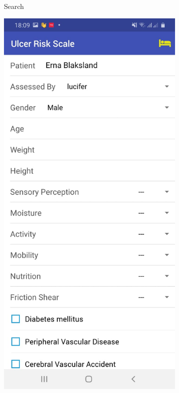 \begin{figure}
\begin{subfigure}[b]{0.125\textwidth}
        \caption{Search}
        \label{fig:search}
    \end{subfigure}
    \hfill %
    \begin{subfigure}[b]{0.125\textwidth}
        \includegraphics[width=\textwidth]{figs/mobapp/img8.jpeg}

\end{subfigure}
\end{figure}
